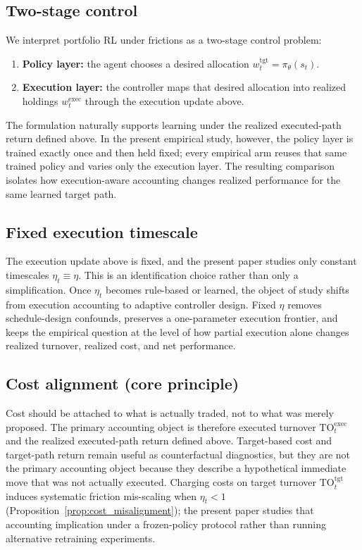 \documentclass[10pt,twocolumn]{article}
\newcommand{\wexec}{w^{\mathrm{exec}}}
\newcommand{\wtgt}{w^{\mathrm{tgt}}}
\newcommand{\TOexec}{\mathrm{TO}^{\mathrm{exec}}}
\newcommand{\TOtgt}{\mathrm{TO}^{\mathrm{tgt}}}
\begin{document}
\subsection{Two-stage control}
We interpret portfolio RL under frictions as a two-stage control problem:
\begin{enumerate}[leftmargin=*,itemsep=1pt]
\item \textbf{Policy layer:} the agent chooses a desired allocation $\wtgt_t=\pi_\theta(s_t)$.
\item \textbf{Execution layer:} the controller maps that desired allocation into realized holdings $\wexec_t$ through the execution update above.
\end{enumerate}
The formulation naturally supports learning under the realized executed-path return defined above. In the present empirical study, however, the policy layer is trained exactly once and then held fixed; every empirical arm reuses that same trained policy and varies only the execution layer. The resulting comparison isolates how execution-aware accounting changes realized performance for the same learned target path.

\subsection{Fixed execution timescale}
The execution update above is fixed, and the present paper studies only constant timescales $\eta_t\equiv\eta$. This is an identification choice rather than only a simplification. Once $\eta_t$ becomes rule-based or learned, the object of study shifts from execution accounting to adaptive controller design. Fixed $\eta$ removes schedule-design confounds, preserves a one-parameter execution frontier, and keeps the empirical question at the level of how partial execution alone changes realized turnover, realized cost, and net performance.

\subsection{Cost alignment (core principle)}
Cost should be attached to what is actually traded, not to what was merely proposed. The primary accounting object is therefore executed turnover $\TOexec_t$ and the realized executed-path return defined above. Target-based cost and target-path return remain useful as counterfactual diagnostics, but they are not the primary accounting object because they describe a hypothetical immediate move that was not actually executed. Charging costs on target turnover $\TOtgt_t$ induces systematic friction mis-scaling when $\eta_t<1$ (Proposition~\ref{prop:cost_misalignment}); the present paper studies that accounting implication under a frozen-policy protocol rather than running alternative retraining experiments.
\end{document}
